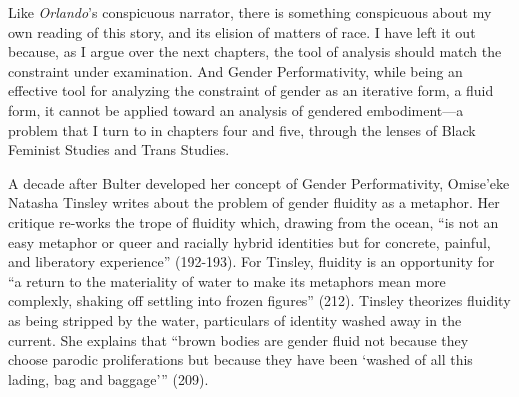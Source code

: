 \documentclass[11pt]{article}
\begin{document}
Like \emph{Orlando}'s conspicuous narrator, there is something conspicuous
about my own reading of this story, and its elision of matters of
race. I have left it out because, as I argue over the next chapters,
the tool of analysis should match the constraint under examination.
And Gender Performativity, while being an effective tool for analyzing
the constraint of gender as an iterative form, a fluid form, it cannot
be applied toward an analysis of gendered embodiment---a problem that
I turn to in chapters four and five, through the lenses of Black
Feminist Studies and Trans Studies.

A decade after Bulter developed her concept of Gender Performativity,
Omise’eke Natasha Tinsley writes about the problem of gender fluidity
as a metaphor. Her critique re-works the trope of fluidity which,
drawing from the ocean, “is not an easy metaphor or queer and racially
hybrid identities but for concrete, painful, and liberatory
experience” (192-193). For Tinsley, fluidity is an opportunity for “a
return to the materiality of water to make its metaphors mean more
complexly, shaking off settling into frozen figures” (212). Tinsley
theorizes fluidity as being stripped by the water, particulars of
identity washed away in the current. She explains that “brown bodies
are gender fluid not because they choose parodic proliferations but
because they have been ‘washed of all this lading, bag and baggage’”
(209).
\end{document}
